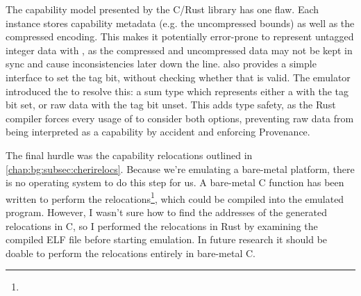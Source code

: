 The capability model presented by the C/Rust library has one flaw.\label{safetaggedcap}
Each  instance stores capability metadata (e.g. the uncompressed bounds) as well as the compressed encoding.
This makes it potentially error-prone to represent untagged integer data with , as the compressed and uncompressed data may not be kept in sync and cause inconsistencies later down the line.
 also provides a simple interface to set the tag bit, without checking whether that is valid.
The emulator introduced the  to resolve this: a sum type which represents either a  with the tag bit set, or raw data with the tag bit unset.
This adds type safety, as the Rust compiler forces every usage of  to consider both options, preventing raw data from being interpreted as a capability by accident and enforcing Provenance.

The final hurdle was the capability relocations outlined in \cref{chap:bg:subsec:cherirelocs}.
Because we're emulating a bare-metal platform, there is no operating system to do this step for us.
A bare-metal C function has been written to perform the relocations\footnote{}, which could be compiled into the emulated program.
However, I wasn't sure how to find the addresses of the generated relocations in C, so I performed the relocations in Rust by examining the compiled ELF file before starting emulation.
In future research it should be doable to perform the relocations entirely in bare-metal C.
